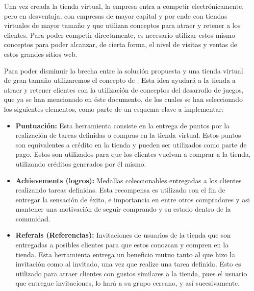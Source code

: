 Una vez creada la tienda virtual, la empresa entra a competir electrónicamente,
pero en desventaja, con empresas de mayor capital y por ende con tiendas virtuales
de mayor tamaño y que utilizan conceptos para atraer y retener a los clientes.
Para poder competir directamente, es necesario utilizar estos mismo conceptos para
poder alcanzar, de cierta forma, el nivel de visitas y ventas de estos grandes
sitios web.

Para poder disminuir la brecha entre la solución propuesta y una tienda virtual
de gran tamaño utilizaremos el concepto de {\GAM}.
Esta idea ayudará a la tienda a atraer y retener clientes con la utilización
de conceptos del desarrollo de juegos, que ya se han mencionado en éste documento,
de los cuales se han seleccionado los siguientes elementos, como parte
de un esquema clave a implementar:

\begin{itemize}
    \item {\bf Puntuación:}
        Esta herramienta consiste en la entrega de puntos por la realización
        de tareas definidas o compras en la tienda virtual.
        Estos puntos son equivalentes a crédito en la tienda y pueden ser
        utilizados como parte de pago.
        Estos son utilizados para que los clientes vuelvan a comprar a la tienda,
        utilizando créditos generados por él mismo.

    \item {\bf Achievements (logros):}
        Medallas coleccionables entregadas a los clientes realizando tareas
        definidas.
        Esta recompensa es utilizada con el fin de entregar la sensación de éxito,
        e importancia en entre otros compradores y asi mantener una motivación
        de seguir comprando y su estado dentro de la comunidad.

    \item {\bf Referals (Referencias):}
        Invitaciones de usuarios de la tienda que son entregadas a posibles
        clientes para que estos conozcan y compren en la tienda.
        Esta herramienta entrega un beneficio mutuo tanto al que hizo la invitación
        como al invitado, una vez que realize una tarea definida.
        Esto es utilizado para atraer clientes con gustos similares
        a la tienda, pues el usuario que entregue invitaciones, lo hará a su
        grupo cercano, y así sucesivamente.

\end{itemize}

